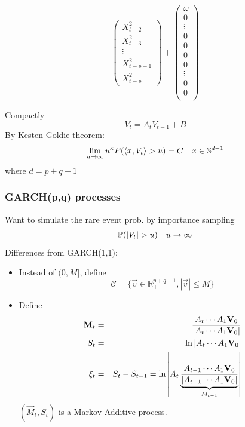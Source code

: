 \documentclass{beamer}
\begin{document}
\begin{frame}
\begin{tiny}
\begin{equation*}
\begin{pmatrix}
        X_{t-2}^2 \\
        X_{t-3}^2 \\
        \vdots \\
        X_{t-p+1}^2 \\
        X_{t-p}^2
      \end{pmatrix} +
      \begin{pmatrix}
        \omega \\
        0 \\
        \vdots \\
        0 \\
        0 \\
        0 \\
        0 \\
        \vdots \\
        0 \\
        0 \\
      \end{pmatrix}
    \end{equation*}
  \end{tiny}
    Compactly
    \[
    V_t = A_t V_{t-1} + B
    \]
    By Kesten-Goldie theorem:
    \[
    \lim_{u \to \infty} u^{\kappa} P(\inn{x, V_t} > u) = C \quad x \in \mathbb S^{d-1}
    \]
    where $d = p + q -1$
\end{frame}

\begin{frame}
  \frametitle{GARCH(p,q) processes}
  \begin{scriptsize}
    Want to simulate the rare event prob. by importance sampling
    \[
    \P(|V_t| > u) \quad u \to \infty  
    \]
    Differences from GARCH(1,1):
    \begin{itemize}
    \item Instead of $(0, M]$, define
      \[
      \mathcal C = \{\vec v \in \mathbb R_+^{p+q-1}, |\vec v| \leq M\}
      \]
    \item Define
      \begin{eqnarray*}
        \vec M_t &=& A_{t} \cdots A_1 \vec V_0 \over |A_{t} \cdots A_1 \vec V_0| \\
        S_t &=& \ln |A_t \cdots A_1 \vec V_0| \\
        \xi_t &=& S_t - S_{t-1} =
                  \ln \left|A_t
                  \underbrace{
                  {A_{t-1} \cdots A_1 \vec V_0 \over |A_{t-1} \cdots A_1 \vec V_0|}
                  }_{M_{t-1}}
                  \right|
      \end{eqnarray*}
      $(\vec M_t, S_t)$ is a Markov Additive process.
    \end{itemize}
  \end{scriptsize}
\end{frame}
\end{document}
